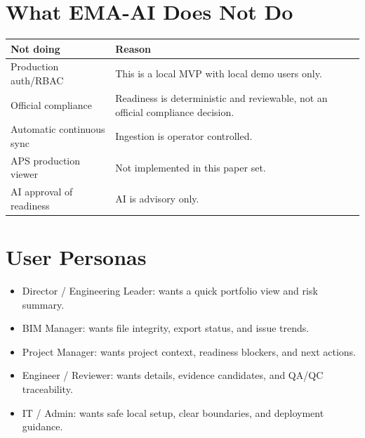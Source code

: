 \documentclass[11pt]{article}
\begin{document}
\section{What EMA-AI Does Not Do}
\begin{tabularx}{\textwidth}{@{}lX@{}}
\toprule
Not doing & Reason \\
\midrule
Production auth/RBAC & This is a local MVP with local demo users only. \\
Official compliance & Readiness is deterministic and reviewable, not an official compliance decision. \\
Automatic continuous sync & Ingestion is operator controlled. \\
APS production viewer & Not implemented in this paper set. \\
AI approval of readiness & AI is advisory only. \\
\bottomrule
\end{tabularx}

\section{User Personas}
\begin{itemize}[leftmargin=*]
\item Director / Engineering Leader: wants a quick portfolio view and risk summary.
\item BIM Manager: wants file integrity, export status, and issue trends.
\item Project Manager: wants project context, readiness blockers, and next actions.
\item Engineer / Reviewer: wants details, evidence candidates, and QA/QC traceability.
\item IT / Admin: wants safe local setup, clear boundaries, and deployment guidance.
\end{itemize}
\end{document}

